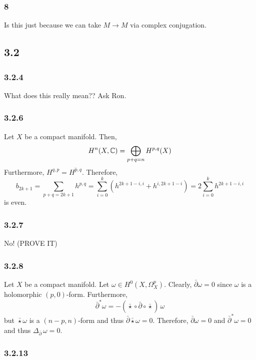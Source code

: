 \documentclass[12pt]{article}
\begin{document}
\subsubsection{8}

Is this just because we can take $M \to M$ via complex conjugation.
 
 
\subsection{3.2}

\subsubsection{3.2.4}
What does this really mean?? Ask Ron.

\subsubsection{3.2.6}

Let $X$ be a compact \kahler manifold. Then,
\[ H^{n}(X, \mathbb{C}) = \bigoplus_{p + q = n} H^{p,q}(X) \]
Furthermore, $H^{q,p} = \overline{H^{p,q}}$. Therefore,
\[ b_{2k + 1} = \sum_{p + q = 2k + 1} h^{p, q} = \sum_{i = 0}^k (h^{2 k + 1 - i, i} + h^{i, 2k + 1 - i}) = 2 \sum_{i = 0}^k h^{2k + 1 - i, i} \]
is even.

\subsubsection{3.2.7}

No! (PROVE IT)

\subsubsection{3.2.8}

Let $X$ be a compact \kahler manifold. Let $\omega \in H^0(X, \Omega^p_X)$. Clearly, $\bar{\partial} \omega = 0$ since $\omega$ is a holomorphic $(p, 0)$-form. Furthermore, 
\[ \bar{\partial}^* \omega = - (\bar{\star} \circ \bar{\partial} \circ \bar{\star}) \, \omega \]
but $\bar{\star} \omega$ is a $(n - p, n)$-form and thus $\bar{\partial} \bar{\star} \omega = 0$. Therefore, $\bar{\partial} \omega = 0$ and $\bar{\partial}^* \omega = 0$ and thus $\Delta_{\bar{\partial}} \, \omega = 0$.

\subsubsection{3.2.13}
\end{document}

